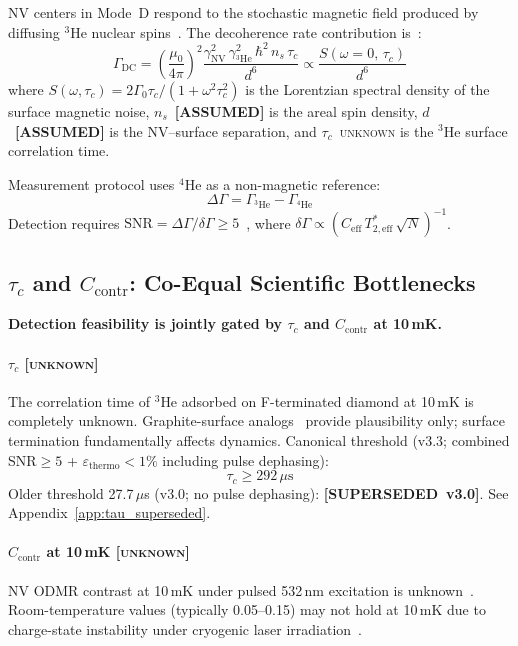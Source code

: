 \documentclass[12pt,a4paper]{article}
\newcommand{\unknown}{\textsc{unknown}}
\newcommand{\assumed}{\textbf{[ASSUMED]}}
\newcommand{\superseded}{\textbf{[SUPERSEDED~v3.0]}}
\begin{document}
NV centers in Mode~D respond to the stochastic magnetic field produced by
diffusing $^3$He nuclear spins~\cite{KolkowitzScience2015,MazeNature2008}.
The decoherence rate contribution is~\cite{DegenRMP2017}:
\begin{equation}
  \Gamma_\mathrm{DC} = \left(\frac{\mu_0}{4\pi}\right)^2
  \frac{\gamma_\mathrm{NV}^2\,\gamma_{^3\mathrm{He}}^2\,\hbar^2\,n_s\,\tau_c}{d^6}
  \propto \frac{S(\omega{=}0,\,\tau_c)}{d^6}
\end{equation}
where $S(\omega,\tau_c) = 2\Gamma_0\tau_c/(1+\omega^2\tau_c^2)$ is the Lorentzian
spectral density of the surface magnetic noise,
$n_s$~\assumed{} is the areal spin density,
$d$~\assumed{} is the NV--surface separation, and
$\tau_c$~\unknown{} is the $^3$He surface correlation time.

Measurement protocol uses $^4$He as a non-magnetic reference:
\begin{equation}
  \Delta\Gamma = \Gamma_{^3\mathrm{He}} - \Gamma_{^4\mathrm{He}}
\end{equation}
Detection requires $\mathrm{SNR} = \Delta\Gamma / \delta\Gamma \geq 5$~\cite{TaylorNatPhys2008},
where $\delta\Gamma \propto (C_\mathrm{eff}\,T_{2,\mathrm{eff}}^*\,\sqrt{N})^{-1}$.

\subsection{$\tau_c$ and $C_\mathrm{contr}$: Co-Equal Scientific Bottlenecks}

\textbf{Detection feasibility is jointly gated by $\tau_c$ and $C_\mathrm{contr}$
at 10\,mK.}

\paragraph{$\tau_c$ [\unknown{}]}
The correlation time of $^3$He adsorbed on F-terminated diamond at 10\,mK is
completely unknown.
Graphite-surface analogs~\cite{Bernu2006,MorhardPRB1996,Greywall1993} provide
plausibility only; surface termination fundamentally affects dynamics.
Canonical threshold (v3.3; combined SNR$\geq5$ + $\varepsilon_\mathrm{thermo}<1\%$
including pulse dephasing):
\begin{equation}
  \tau_c \geq 292\,\mu\mathrm{s}
\end{equation}
Older threshold 27.7\,$\mu$s (v3.0; no pulse dephasing): \superseded{}.
See Appendix~\ref{app:tau_superseded}.

\paragraph{$C_\mathrm{contr}$ at 10\,mK [\unknown{}]}
NV ODMR contrast at 10\,mK under pulsed 532\,nm excitation is unknown~\cite{Sangtawesin2019,TrusheimPRL2020}.
Room-temperature values (typically 0.05--0.15) may not hold at 10\,mK due to
charge-state instability under cryogenic laser irradiation~\cite{RondinRMP2014}.
\end{document}

